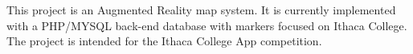 This project is an Augmented Reality map system. It is currently implemented with a P\-H\-P/\-M\-Y\-S\-Q\-L back-\/end database with markers focused on Ithaca College. The project is intended for the Ithaca College App competition. 